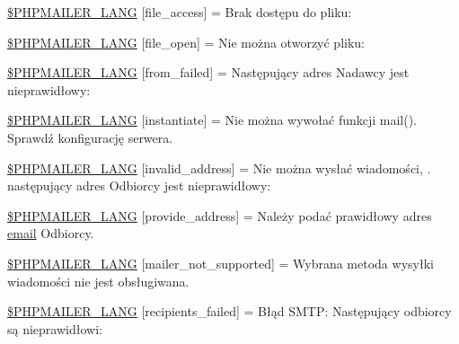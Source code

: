 \begin{DoxyCompactItemize}
\item 
\hyperlink{phpmailer_8lang-pl_8php_a7e83349023b856ef9e5c46e30ae6d51e}{\$\+P\+H\+P\+M\+A\+I\+L\+E\+R\+\_\+\+L\+A\+NG} \mbox{[}\textquotesingle{}file\+\_\+access\textquotesingle{}\mbox{]} = \textquotesingle{}Brak dostępu do pliku\+: \textquotesingle{}
\item 
\hyperlink{phpmailer_8lang-pl_8php_a28d1a6517bf4c942a0ddd506188ad2e0}{\$\+P\+H\+P\+M\+A\+I\+L\+E\+R\+\_\+\+L\+A\+NG} \mbox{[}\textquotesingle{}file\+\_\+open\textquotesingle{}\mbox{]} = \textquotesingle{}Nie można otworzyć pliku\+: \textquotesingle{}
\item 
\hyperlink{phpmailer_8lang-pl_8php_adf832ae12155a09be077c6d5e4fd7e22}{\$\+P\+H\+P\+M\+A\+I\+L\+E\+R\+\_\+\+L\+A\+NG} \mbox{[}\textquotesingle{}from\+\_\+failed\textquotesingle{}\mbox{]} = \textquotesingle{}Następujący adres Nadawcy jest nieprawidłowy\+: \textquotesingle{}
\item 
\hyperlink{phpmailer_8lang-pl_8php_ad58dde16780f4770ccf4dd282ea1f5ad}{\$\+P\+H\+P\+M\+A\+I\+L\+E\+R\+\_\+\+L\+A\+NG} \mbox{[}\textquotesingle{}instantiate\textquotesingle{}\mbox{]} = \textquotesingle{}Nie można wywołać funkcji mail(). Sprawdź konfigurację serwera.\textquotesingle{}
\item 
\hyperlink{phpmailer_8lang-pl_8php_a42d61bcea4c79599ecb44fd062f54d47}{\$\+P\+H\+P\+M\+A\+I\+L\+E\+R\+\_\+\+L\+A\+NG} \mbox{[}\textquotesingle{}invalid\+\_\+address\textquotesingle{}\mbox{]} = \textquotesingle{}Nie można wysłać wiadomości, \textquotesingle{} . \textquotesingle{}następujący adres Odbiorcy jest nieprawidłowy\+: \textquotesingle{}
\item 
\hyperlink{phpmailer_8lang-pl_8php_a8b97897c2406b7392b056f375feeefbb}{\$\+P\+H\+P\+M\+A\+I\+L\+E\+R\+\_\+\+L\+A\+NG} \mbox{[}\textquotesingle{}provide\+\_\+address\textquotesingle{}\mbox{]} = \textquotesingle{}Należy podać prawidłowy adres \hyperlink{actions_2account_8php_a011c66ae212438e0d7de7c0e40451bb3}{email} Odbiorcy.\textquotesingle{}
\item 
\hyperlink{phpmailer_8lang-pl_8php_aa2ebcb8833ee83a7ad67401c4bb3a6ad}{\$\+P\+H\+P\+M\+A\+I\+L\+E\+R\+\_\+\+L\+A\+NG} \mbox{[}\textquotesingle{}mailer\+\_\+not\+\_\+supported\textquotesingle{}\mbox{]} = \textquotesingle{}Wybrana metoda wysyłki wiadomości nie jest obsługiwana.\textquotesingle{}
\item 
\hyperlink{phpmailer_8lang-pl_8php_a7589d30bb9b368327c2df015f3e6bcba}{\$\+P\+H\+P\+M\+A\+I\+L\+E\+R\+\_\+\+L\+A\+NG} \mbox{[}\textquotesingle{}recipients\+\_\+failed\textquotesingle{}\mbox{]} = \textquotesingle{}Błąd S\+M\+T\+P\+: Następujący odbiorcy są nieprawidłowi\+: \textquotesingle{}

\end{DoxyCompactItemize}
